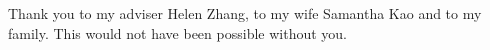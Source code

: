 
\hspace{0pt}
\vfill
\begin{center}
	Thank you to my adviser Helen Zhang, to my wife Samantha Kao and to my family. This would not have been possible without you.
\end{center}
\vfill
\hspace{0pt}